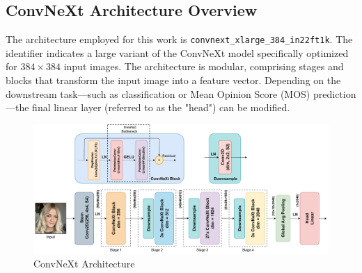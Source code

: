 \documentclass[a4paper,12pt,openright]{book}
\begin{document}
\subsection{ConvNeXt Architecture Overview}
The architecture employed for this work is \texttt{convnext\_xlarge\_384\_in22ft1k}. The identifier indicates a large variant of the ConvNeXt model specifically optimized for \(384 \times 384\) input images. The architecture is modular, comprising stages and blocks that transform the input image into a feature vector. Depending on the downstream task—such as classification or Mean Opinion Score (MOS) prediction—the final linear layer (referred to as the "head") can be modified.

\begin{figure}[h]
\centering
\includegraphics[width=1.2\textwidth]{images/convok.drawio (1).pdf}
\caption{ConvNeXt Architecture}
\label{fig:convnext}
\end{figure}
\end{document}
